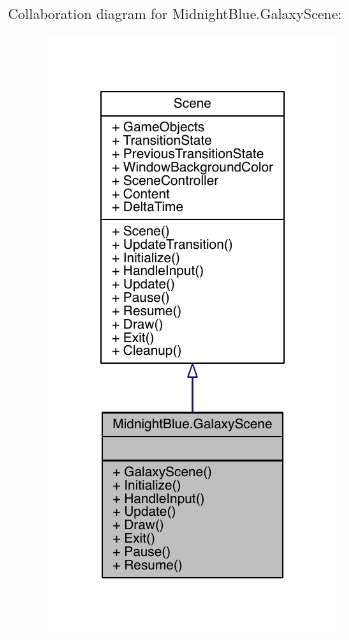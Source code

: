 Collaboration diagram for Midnight\+Blue.\+Galaxy\+Scene\+:\nopagebreak
\begin{figure}[H]
\begin{center}
\leavevmode
\includegraphics[width=217pt]{class_midnight_blue_1_1_galaxy_scene__coll__graph}
\end{center}
\end{figure}
